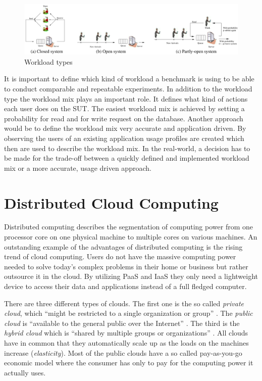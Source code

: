 \begin{figure}[h]
  \centering
  \includegraphics[width=\textwidth]{Figures/workload_types.png}
  \caption[Workload types]{Workload types \cite[2]{Schroeder.2006}}
  \label{fig:workload-types}
\end{figure}

It is important to define which kind of workload a benchmark is using to be able to conduct comparable and repeatable experiments. In addition to the workload type the workload mix plays an important role. It defines what kind of actions each user does on the \ac{SUT}. The easiest workload mix is achieved by setting a probability for read and for write request on the database. Another approach would be to define the workload mix very accurate and application driven. By observing the users of an existing application usage profiles are created which then are used to describe the workload mix. In the real-world, a decision has to be made for the trade-off between a quickly defined and implemented workload mix or a more accurate, usage driven approach.

\section{Distributed Cloud Computing}
\label{sec:distributed-computing}
Distributed computing describes the segmentation of computing power from one processor core on one physical machine to multiple cores on various machines. An outstanding example of the advantages of distributed computing is the rising trend of cloud computing. Users do not have the massive computing power needed to solve today's complex problems in their home or business but rather outsource it in the cloud. By utilizing \acf{PaaS} and \acf{IaaS} they only need a lightweight device to access their data and applications instead of a full fledged computer. \cite[1 - 2]{dikaiakos.2009}

There are three different types of clouds. The first one is the so called \emph{private cloud}, which \enquote{might be restricted to a single organization or group} \cite[2]{dikaiakos.2009}. The \emph{public cloud} is \enquote{available to the general public over the Internet} \cite[2]{dikaiakos.2009}. The third is the \emph{hybrid cloud} which is \enquote{shared by multiple groups or organizations} \cite[2]{dikaiakos.2009}. All clouds have in common that they automatically scale up as the loads on the machines increase (\emph{elasticity}). Most of the public clouds have a so called pay-as-you-go economic model where the consumer has only to pay for the computing power it actually uses. \cite[2]{dikaiakos.2009}


